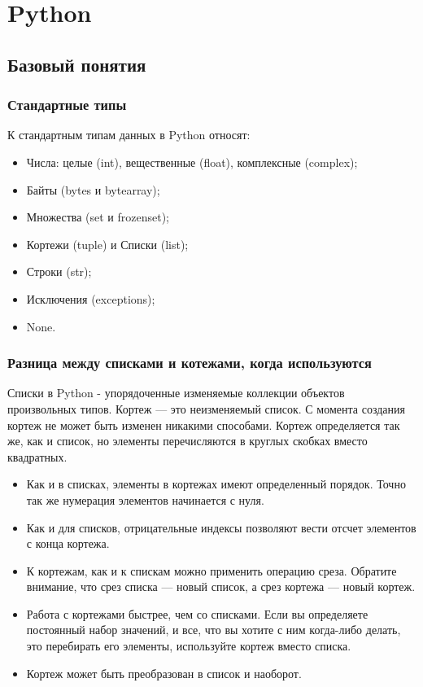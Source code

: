 \part{Python}

\chapter{Базовый понятия}

\section{Стандартные типы}

	К стандартным типам данных в Python относят:
	\begin{itemize}
		\item Числа: целые (int), вещественные (float), комплексные (complex);
		\item Байты (bytes и bytearray);
		\item Множества (set и frozenset);
		\item Кортежи (tuple) и Списки (list);
		\item Строки (str);
		\item Исключения (exceptions);
		\item None.
	\end{itemize}
	
\section{Разница между списками и котежами, когда используются}

	Списки в Python - упорядоченные изменяемые коллекции объектов произвольных типов.  
Кортеж — это неизменяемый список. С момента создания кортеж не может быть изменен никакими способами.  Кортеж определяется так же, как и список, но элементы перечисляются в круглых скобках вместо квадратных.
	\begin{itemize}
\item	Как и в списках, элементы в кортежах имеют определенный порядок. Точно так же нумерация элементов начинается с нуля. 
\item	Как и для списков, отрицательные индексы позволяют вести отсчет элементов с конца кортежа.
\item	К кортежам, как и к спискам можно применить операцию среза. Обратите внимание, что срез списка — новый список, а срез кортежа — новый кортеж.
\item	Работа с кортежами быстрее, чем со списками. Если вы определяете постоянный набор значений, и все, что вы хотите с ним когда-либо делать, это перебирать его элементы, используйте кортеж вместо списка.
\item	Кортеж может быть преобразован в список и наоборот.
	\end{itemize}
	

